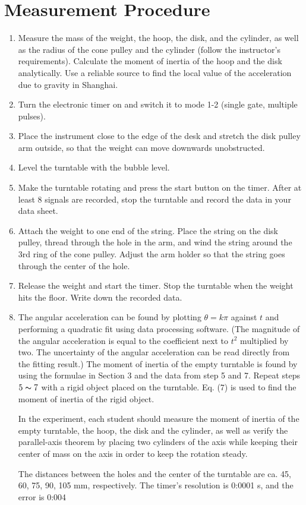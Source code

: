 \documentclass[12pt]{article}
\begin{document}
\section{Measurement Procedure}
\begin{enumerate}
\item  Measure the mass of the weight, the hoop, the disk, and the cylinder, as well as
the radius of the cone pulley and the cylinder (follow the instructor's requirements).
Calculate the moment of inertia of the hoop and the disk analytically.
Use a reliable source to find the local value of the acceleration due to gravity in
Shanghai.
\item Turn the electronic timer on and switch it to mode 1-2 (single gate, multiple pulses).
\item Place the instrument close to the edge of the desk and stretch the disk pulley arm
outside, so that the weight can move downwards unobstructed.
\item Level the turntable with the bubble level.
\item Make the turntable rotating and press the start button on the timer. After at least
8 signals are recorded, stop the turntable and record the data in your data sheet.
\item Attach the weight to one end of the string. Place the string on the disk pulley,
thread through the hole in the arm, and wind the string around the 3rd ring of the
cone pulley. Adjust the arm holder so that the string goes through the center of the
hole.
\item Release the weight and start the timer. Stop the turntable when the weight hits the
floor. Write down the recorded data.
\item The angular acceleration can be found by plotting $\theta= k\pi$ against $t$ and performing a quadratic fit using data processing software. (The magnitude of the angular
acceleration is equal to the coefficient next to $t^2$ multiplied by two. The uncertainty
of the angular acceleration can be read directly from the fitting result.)
The moment of inertia of the empty turntable is found by using the formulae in
Section 3 and the data from step 5 and 7. Repeat steps $5\thicksim7$ with a rigid object
placed on the turntable. Eq. (7) is used to find the moment of inertia of the rigid
object.
\par In the experiment, each student should measure the moment of inertia of the empty
turntable, the hoop, the disk and the cylinder, as well as verify the parallel-axis theorem by placing two cylinders of the axis while keeping their center of mass on the axis in
order to keep the rotation steady.
\par The distances between the holes and the center of the turntable are ca. 45, 60, 75, 90,
105 mm, respectively. The timer's resolution is 0:0001 s, and the error is 0:004%
\end{enumerate}
\end{document}
